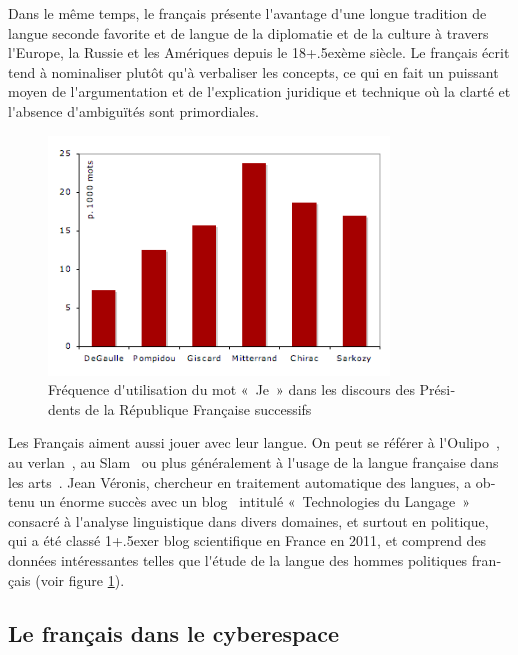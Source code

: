 \begin{french}
\begin{multicols}{2}
Dans le même temps, le français présente l{\mbox '}avantage d{\mbox '}une
longue tradition de langue seconde favorite et de langue de la
diplomatie et de la culture à travers l{\mbox '}Europe, la Russie et
les Amériques depuis le 18\raise+.5ex\hbox{ème} siècle. Le français
écrit tend à nominaliser plutôt qu{\mbox '}à verbaliser les concepts,
ce qui en fait un puissant moyen de l{\mbox '}argumentation et de
l{\mbox '}explication juridique et technique où la clarté et l{\mbox
 '}absence d{\mbox '}ambiguïtés sont primordiales.
%
\begin{figure}[t]
\begin{center}
 \includegraphics[height=2.5in]{_media/french/french_pix1_freq_je.png} 
  \caption{Fréquence d{\mbox '}utilisation du mot «~Je~» dans les discours des Présidents de la République Française successifs}
  \label{fig:je_stats}
\end{center}
\end{figure}
%
Les Français aiment aussi jouer avec leur langue. On peut se référer à
l{\mbox '}Oulipo~\cite{oulipo}, au verlan~\cite{plenat95}, au
Slam~\cite{slam} ou plus généralement à l{\mbox '}usage de la langue
française dans les arts~\cite{arts}. Jean Véronis, chercheur en
traitement automatique des langues, a obtenu un énorme succès avec un
blog~\cite{veronis} intitulé «~Technologies du Langage~» consacré à
l{\mbox '}analyse linguistique dans divers domaines, et surtout en
politique, qui a été classé 1\raise+.5ex\hbox{er} blog scientifique en
France en 2011, et comprend des données intéressantes telles que
l{\mbox '}étude de la langue des hommes politiques français (voir
figure \ref{fig:je_stats}).



\subsection{Le français dans le cyberespace}


\end{multicols}
\end{french}
